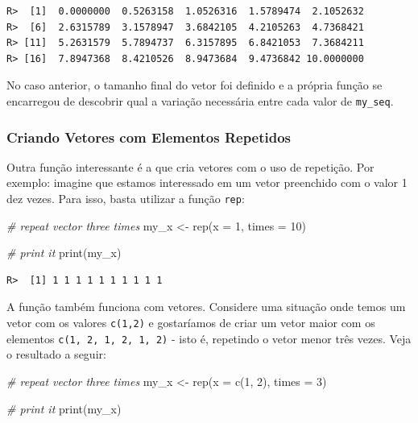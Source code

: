 \documentclass[
  11pt,
]{book}
\newenvironment{Shaded}{\begin{snugshade}}{\end{snugshade}}
\newcommand{\AttributeTok}[1]{\textcolor[rgb]{0.61,0.61,0.61}{#1}}
\newcommand{\CommentTok}[1]{\textcolor[rgb]{0.37,0.37,0.37}{\textit{#1}}}
\newcommand{\DecValTok}[1]{\textcolor[rgb]{0.06,0.06,0.06}{#1}}
\newcommand{\FunctionTok}[1]{\textcolor[rgb]{0,0,0}{#1}}
\newcommand{\NormalTok}[1]{#1}
\newcommand{\OtherTok}[1]{\textcolor[rgb]{0.37,0.37,0.37}{#1}}
\begin{document}
\begin{verbatim}
R>  [1]  0.0000000  0.5263158  1.0526316  1.5789474  2.1052632
R>  [6]  2.6315789  3.1578947  3.6842105  4.2105263  4.7368421
R> [11]  5.2631579  5.7894737  6.3157895  6.8421053  7.3684211
R> [16]  7.8947368  8.4210526  8.9473684  9.4736842 10.0000000
\end{verbatim}

No caso anterior, o tamanho final do vetor foi definido e a própria função se encarregou de descobrir qual a variação necessária entre cada valor de \texttt{my\_seq}.

\hypertarget{criando-vetores-com-elementos-repetidos}{%
\subsubsection{Criando Vetores com Elementos Repetidos}\label{criando-vetores-com-elementos-repetidos}}

Outra função interessante é a que cria vetores com o uso de repetição. Por exemplo: imagine que estamos interessado em um vetor preenchido com o valor 1 dez vezes. Para isso, basta utilizar a função \texttt{rep}: 

\begin{Shaded}
\begin{Highlighting}[]
\CommentTok{\# repeat vector three times}
\NormalTok{my\_x }\OtherTok{\textless{}{-}} \FunctionTok{rep}\NormalTok{(}\AttributeTok{x =} \DecValTok{1}\NormalTok{, }\AttributeTok{times =} \DecValTok{10}\NormalTok{)}

\CommentTok{\# print it}
\FunctionTok{print}\NormalTok{(my\_x)}
\end{Highlighting}
\end{Shaded}

\begin{verbatim}
R>  [1] 1 1 1 1 1 1 1 1 1 1
\end{verbatim}

A função também funciona com vetores. Considere uma situação onde temos um vetor com os valores \texttt{c(1,2)} e gostaríamos de criar um vetor maior com os elementos \texttt{c(1,\ 2,\ 1,\ 2,\ 1,\ 2)} - isto é, repetindo o vetor menor três vezes. Veja o resultado a seguir:

\begin{Shaded}
\begin{Highlighting}[]
\CommentTok{\# repeat vector three times}
\NormalTok{my\_x }\OtherTok{\textless{}{-}} \FunctionTok{rep}\NormalTok{(}\AttributeTok{x =} \FunctionTok{c}\NormalTok{(}\DecValTok{1}\NormalTok{, }\DecValTok{2}\NormalTok{), }\AttributeTok{times =} \DecValTok{3}\NormalTok{)}

\CommentTok{\# print it}
\FunctionTok{print}\NormalTok{(my\_x)}
\end{Highlighting}
\end{Shaded}
\end{document}

